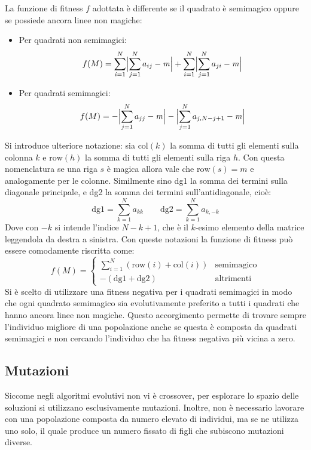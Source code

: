 \documentclass[italian,twoside,twocolumn]{article}
\begin{document}
La funzione di fitness $ f $ adottata è differente se il quadrato è semimagico oppure se possiede ancora linee non magiche:
\begin{itemize}
	\item Per quadrati non semimagici:
	\[	f(M) = \sum_{i=1}^{N}\Bigl\lvert\sum_{j=1}^{N} a_{ij} - \mathit{m} \Bigr\rvert + \sum_{i=1}^{N}\Bigl\lvert\sum_{j=1}^{N} a_{ji} - \mathit{m} \Bigr\rvert 	\]
	\item Per quadrati semimagici:
	\[	f(M) = -\Bigl\lvert\sum_{j=1}^{N} a_{jj} - \mathit{m} \Bigr\rvert - \Bigl\lvert\sum_{j=1}^{N} a_{j,N-j+1} - \mathit{m} \Bigr\rvert 	\]	
\end{itemize}
Si introduce ulteriore notazione: sia $ \text{col}(k) $ la somma di tutti gli elementi sulla colonna $ k $ e $ \text{row}(h) $ la somma di tutti gli elementi sulla riga $ h $. Con questa nomenclatura se una riga $ s $ è magica allora vale che $ \text{row}(s) = \mathit{m}$ e analogamente per le colonne. Similmente sino dg1 la somma dei termini sulla diagonale principale, e dg2 la somma dei termini sull'antidiagonale, cioè:
\[\text{dg1} = \sum_{k = 1}^Na_{kk}  \qquad \text{dg2} = \sum_{k = 1}^Na_{k,-k}  \]
Dove con $ -k $ si intende l'indice $ N-k+1 $, che è il $ k $-esimo elemento della matrice leggendola da destra a sinistra.
Con queste notazioni la funzione di fitness può essere comodamente riscritta come:
\[ f(M) = 
\begin{cases}
\sum_{i = 1}^{N}\left(\text{row}(i) + \text{col}(i) \right) & \text{semimagico} \\
- \left(\text{dg1} + \text{dg2} \right) & \text{altrimenti} 
\end{cases}
\]
Si è scelto di utilizzare una fitness negativa per i quadrati semimagici in modo che ogni quadrato semimagico sia evolutivamente preferito a tutti i quadrati che hanno ancora linee non magiche. Questo accorgimento permette di trovare sempre l'individuo migliore di una popolazione anche se questa è composta da quadrati semimagici e non cercando l'individuo che ha fitness negativa più vicina a zero.   

\subsection{Mutazioni}
Siccome negli algoritmi evolutivi non vi è crossover, per esplorare lo spazio delle soluzioni si utilizzano esclusivamente mutazioni. Inoltre, non è necessario lavorare con una popolazione composta da numero elevato di individui, ma se ne utilizza uno solo, il quale produce un numero fissato di figli che subiscono mutazioni diverse.
\end{document}
